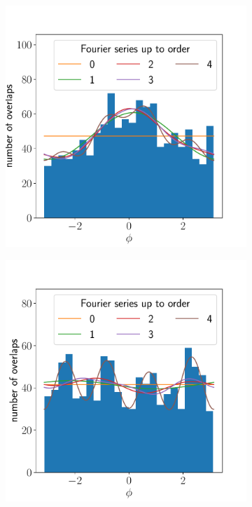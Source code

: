 \documentclass{article}
\begin{document}
\begin{figure}[ht]
\begin{subfigure}{0.24\linewidth}
		\caption{}
		\label{fig:isotropyhistvectra3corners}
	\end{subfigure}
	\begin{subfigure}{0.24\linewidth}
		\includegraphics[width=\linewidth]{isotropy-histogram-JHUVectra-2-corners}
		\caption{}
		\label{fig:isotropyhistvectra2corners}
	\end{subfigure}
	\begin{subfigure}{0.24\linewidth}
		\includegraphics[width=\linewidth]{isotropy-histogram-JHUVectra-1-corners}

\end{subfigure}
\end{figure}
\end{document}
